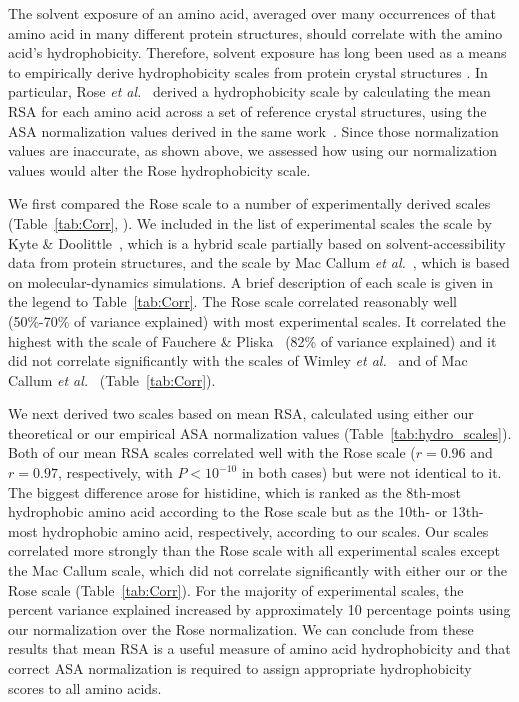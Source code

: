 \documentclass[11pt]{article}
\begin{document}
The solvent exposure of an amino acid, averaged over many occurrences of that amino acid in many different protein structures, should correlate with the amino acid's hydrophobicity. Therefore, solvent exposure has long been used as a means to empirically derive hydrophobicity scales from protein crystal structures \cite{Chothia1976,Rose1985}. In particular, Rose \emph{et al.}~\cite{Rose1985} derived a hydrophobicity scale by calculating the mean RSA for each amino acid across a set of reference crystal structures, using the ASA normalization values derived in the same work~\cite{Rose1985}. Since those normalization values are inaccurate, as shown above, we assessed how using our normalization values would alter the Rose hydrophobicity scale.

We first compared the Rose scale to a number of experimentally derived scales (Table~\ref{tab:Corr}, \cite{Wolfenden1981,Kyte1981,Fauchere1983,Radzicka1988,MacCallum2007,Moon2011,Wimley1996}). We included in the list of experimental scales the scale by Kyte \& Doolittle~\cite{Kyte1981}, which is a hybrid scale partially based on solvent-accessibility data from protein structures, and the scale by Mac Callum \emph{et al.}~\cite{MacCallum2007}, which is based on molecular-dynamics simulations. A brief description of each scale is given in the legend to Table~\ref{tab:Corr}. The Rose scale correlated reasonably well (50\%-70\% of variance explained) with most experimental scales. It correlated the highest with the scale of Fauchere \& Pliska~\cite{Fauchere1983} (82\% of variance explained) and it did not correlate significantly with the scales of Wimley \emph{et al.}~\cite{Wimley1996} and of Mac Callum \emph{et al.}~\cite{MacCallum2007} (Table~\ref{tab:Corr}).

We next derived two scales based on mean RSA, calculated using either our theoretical or our empirical ASA normalization values (Table~\ref{tab:hydro_scales}). Both of our mean RSA scales correlated well with the Rose scale ($r=0.96$ and $r=0.97$, respectively, with $P<10^{-10}$ in both cases) but were not identical to it. The biggest difference arose for histidine, which is ranked as the 8th-most hydrophobic amino acid according to the Rose scale but as the 10th- or 13th-most hydrophobic amino acid, respectively, according to our scales. Our scales correlated more strongly than the Rose scale with all experimental scales except the Mac Callum scale, which did not correlate significantly with either our or the Rose scale (Table~\ref{tab:Corr}). For the majority of experimental scales, the percent variance explained increased by approximately 10 percentage points using our normalization over the Rose normalization. We can conclude from these results that mean RSA is a useful measure of amino acid hydrophobicity and that correct ASA normalization is required to assign appropriate hydrophobicity scores to all amino acids.
\end{document}
